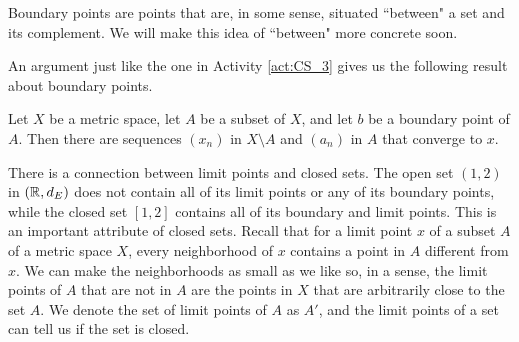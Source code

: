 \begin{comment}

\ActivitySolution

\ba
\item Suppose $(a_n)$ is a sequence in $A$ that converges to $a$. Let $N$ be a neighborhood of $a$ in $X$ such that $A \cap N = \{a\}$. Since $N$ is a neighborhood of $a$, there is an open ball $B(a,\epsilon)$ that is a subset of $N$.  The fact that $(a_n)$ converges to $a$ means that there is a positive integer $K$ such that $k \geq K$ implies that $d(a_k,a) < \epsilon$. Then $a_k \in (A \cap N)$ and so $a_k = a$.  

\item We prove the contrapositive. Assume that $a$ is not an isolated point of $A$. We will show that there is a sequence in $A$ that converges to $a$ that is not eventually constant. For each positive integer $n$, we know that $B\left(x, \frac{1}{n}\right)$ is a neighborhood of $a$. Since $a$ is not a limit point of $A$, it follows that $B\left(x, \frac{1}{n}\right) \cap A$ contains an element $a_n$ of $A$ different from $a$.But then $(a_n)$ is a sequence in $A$ that converges to $a$ with $a_n \neq a$ for every $n$.  

\ea

\end{comment}

Boundary points are points that are, in some sense, situated ``between" a set and its complement. We will make this idea of ``between" more concrete soon. 

An argument just like the one in Activity \ref{act:CS_3} gives us the following result about boundary points. 

\begin{theorem} \label{thm:CS_2} Let $X$ be a metric space, let $A$ be a subset of $X$, and let $b$ be a boundary point of $A$. Then there are sequences $(x_n)$ in $X \setminus A$ and $(a_n)$ in $A$ that converge to $x$.
\end{theorem}


There is a connection between limit points and closed sets. The open set $(1,2)$ in $(\mathbb{R}, d_E)$ does not contain all of its limit points or any of its boundary points, while the closed set $[1,2]$ contains all of its boundary and limit points. This is an important attribute of closed sets. Recall that for a limit point $x$ of a subset $A$ of a metric space $X$, every neighborhood of $x$ contains a point in $A$ different from $x$. We can make the neighborhoods as small as we like so, in a sense, the limit points of $A$ that are not in $A$ are the points in $X$ that are arbitrarily close to the set $A$. We denote the set of limit points of $A$ as $A'$, and the limit points of a set can tell us if the set is closed.

